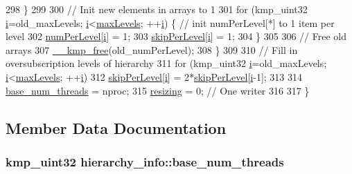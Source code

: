 \begin{DoxyCode}
298             \}
299 
300             \textcolor{comment}{// Init new elements in arrays to 1}
301             \textcolor{keywordflow}{for} (kmp\_uint32 \hyperlink{kmp__stub_8c_a08582ce460e3d5e1cf0b7fea017d608e}{i}=old\_maxLevels; \hyperlink{kmp__stub_8c_a08582ce460e3d5e1cf0b7fea017d608e}{i}<\hyperlink{classhierarchy__info_aafbad4b89a239ea459aaef1ab4908aba}{maxLevels}; ++\hyperlink{kmp__stub_8c_a08582ce460e3d5e1cf0b7fea017d608e}{i}) \{ \textcolor{comment}{// init numPerLevel[*] to 1
       item per level}
302                 \hyperlink{classhierarchy__info_a12fc455d853883d91e3a19567aaac3fe}{numPerLevel}[\hyperlink{kmp__stub_8c_a08582ce460e3d5e1cf0b7fea017d608e}{i}] = 1;
303                 \hyperlink{classhierarchy__info_a80259c2cd48bb476b3eea860723e7fa8}{skipPerLevel}[\hyperlink{kmp__stub_8c_a08582ce460e3d5e1cf0b7fea017d608e}{i}] = 1;
304             \}
305 
306             \textcolor{comment}{// Free old arrays}
307             \hyperlink{kmp_8h_a052396231429341ba56a7c1ceacbaa2f}{\_\_kmp\_free}(old\_numPerLevel);
308         \}
309 
310         \textcolor{comment}{// Fill in oversubscription levels of hierarchy}
311         \textcolor{keywordflow}{for} (kmp\_uint32 \hyperlink{kmp__stub_8c_a08582ce460e3d5e1cf0b7fea017d608e}{i}=old\_maxLevels; \hyperlink{kmp__stub_8c_a08582ce460e3d5e1cf0b7fea017d608e}{i}<\hyperlink{classhierarchy__info_aafbad4b89a239ea459aaef1ab4908aba}{maxLevels}; ++\hyperlink{kmp__stub_8c_a08582ce460e3d5e1cf0b7fea017d608e}{i})
312             \hyperlink{classhierarchy__info_a80259c2cd48bb476b3eea860723e7fa8}{skipPerLevel}[\hyperlink{kmp__stub_8c_a08582ce460e3d5e1cf0b7fea017d608e}{i}] = 2*\hyperlink{classhierarchy__info_a80259c2cd48bb476b3eea860723e7fa8}{skipPerLevel}[\hyperlink{kmp__stub_8c_a08582ce460e3d5e1cf0b7fea017d608e}{i}-1];
313 
314         \hyperlink{classhierarchy__info_a9055a443e8da4aefcfef1b5f1fd43b42}{base\_num\_threads} = nproc;
315         \hyperlink{classhierarchy__info_afa2edd0b49e3c69a50f3bbebfbd4ad77}{resizing} = 0; \textcolor{comment}{// One writer}
316 
317     \}
\end{DoxyCode}


\subsection{Member Data Documentation}
\hypertarget{classhierarchy__info_a9055a443e8da4aefcfef1b5f1fd43b42}{
\subsubsection[{base\-\_\-num\-\_\-threads}]{\setlength{\rightskip}{0pt plus 5cm}kmp\-\_\-uint32 hierarchy\-\_\-info\-::base\-\_\-num\-\_\-threads}}\label{classhierarchy__info_a9055a443e8da4aefcfef1b5f1fd43b42}


